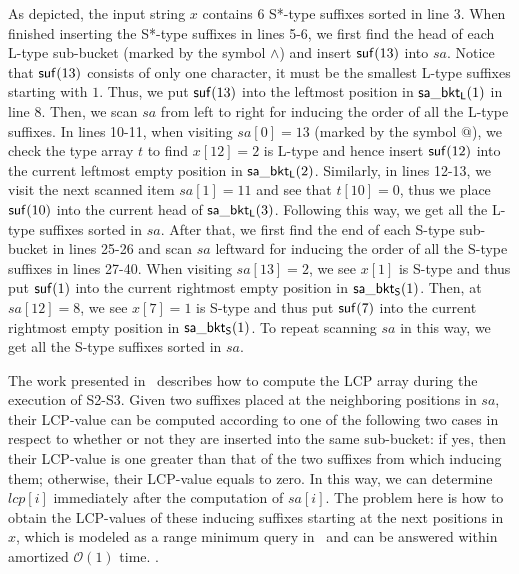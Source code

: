 \documentclass[10pt,journal,compsoc]{IEEEtran}
\begin{document}
As depicted, the input string $x$ contains 6 S*-type suffixes sorted in line 3. When finished inserting the S*-type suffixes in lines 5-6, we first find the head of each L-type sub-bucket (marked by the symbol $\wedge$) and insert ${\sf suf}(13)$ into $sa$. Notice that ${\sf suf}(13)$ consists of only one character, it must be the smallest L-type suffixes starting with $1$. Thus, we put ${\sf suf}(13)$ into the leftmost position in ${\sf sa\_bkt_L}(1)$ in line 8. Then, we scan $sa$ from left to right for inducing the order of all the L-type suffixes. In lines 10-11, when visiting $sa[0] = 13$ (marked by the symbol $@$), we check the type array $t$ to find $x[12] = 2$ is L-type and hence insert ${\sf suf}(12)$ into the current leftmost empty position in ${\sf sa\_bkt_L}(2)$. Similarly, in lines 12-13, we visit the next scanned item $sa[1] = 11$ and see that $t[10] = 0$, thus we place ${\sf suf}(10)$ into the current head of ${\sf sa\_bkt_L}(3)$. Following this way, we get all the L-type suffixes sorted in $sa$. After that, we first find the end of each S-type sub-bucket in lines 25-26 and scan $sa$ leftward for inducing the order of all the S-type suffixes in lines 27-40. When visiting $sa[13] = 2$, we see $x[1]$ is S-type and thus put ${\sf suf}(1)$ into the current rightmost empty position in ${\sf sa\_bkt_S}(1)$. Then, at $sa[12] = 8$, we see $x[7] = 1$ is S-type and thus put ${\sf suf}(7)$ into the current rightmost empty position in ${\sf sa\_bkt_S}(1)$. To repeat scanning $sa$ in this way, we get all the S-type suffixes sorted in $sa$. 

The work presented in~\cite{Fischer11} describes how to compute the LCP array during the execution of S2-S3. Given two suffixes placed at the neighboring positions in $sa$, their LCP-value can be computed according to one of the following two cases in respect to whether or not they are inserted into the same sub-bucket: if yes, then their LCP-value is one greater than that of the two suffixes from which inducing them; otherwise, their LCP-value equals to zero. In this way, we can determine $lcp[i]$ immediately after the computation of $sa[i]$. The problem here is how to obtain the LCP-values of these inducing suffixes starting at the next positions in $x$, which is modeled as a range minimum query in~\cite{Fischer11} and can be answered within amortized $\mathcal{O}(1)$ time. {\color{red}{For example, when scanning $sa[0]$ and $sa[5]$ in lines 10-11 and 20-21 of Fig.~\ref{fig:example2}, we sequentially induce ${\sf suf}(12)$ and ${\sf suf}(6)$ into the neighboring positions in ${\sf sa\_bkt_L(2)}$. In the meantime, if we keep recording the minimum over $lcp(0, 5]$, then we can obtain the LCP-value of the inducing suffixes ${\sf suf}(13)$ and ${\sf suf}(7)$ when putting the induced suffix ${\sf suf}(6)$ into $sa$}}.
\end{document}
